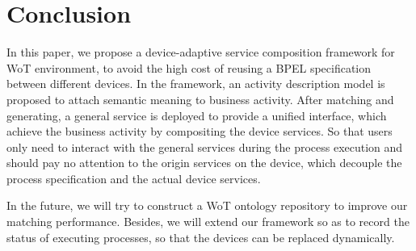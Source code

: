 \section{Conclusion}
\label{Conclusion}
In this paper, we propose a device-adaptive service composition framework for WoT environment, to avoid the high cost of reusing a BPEL specification between different devices. In the framework, an activity description model is proposed to attach semantic meaning to business activity. After matching and generating, a general service is deployed to provide a unified interface, which achieve the business activity by compositing the device services. So that users only need to interact with the general services during the process execution and should pay no attention to the origin services on the device, which decouple the process specification and the actual device services. 

In the future, we will try to construct a WoT ontology repository to improve our matching performance. Besides, we will extend our framework so as to record the status of executing processes, so that the devices can be replaced dynamically. 
